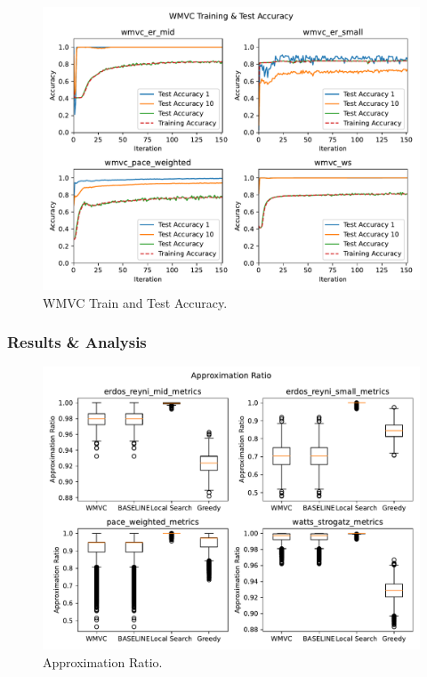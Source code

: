 \documentclass{article}
\begin{document}
\begin{figure}
     \centering
     \includegraphics[width=\textwidth]{figures/wmvc_test}
     \caption{WMVC Train and Test Accuracy.}
     \label{fig:wmvc_test}
\end{figure}

\subsubsection{Results \& Analysis}
\begin{figure}
     \centering
     \includegraphics[width=\textwidth]{figures/approx_ratio}
     \caption{Approximation Ratio.}
     \label{fig:approx_ratio}
\end{figure}
\end{document}
